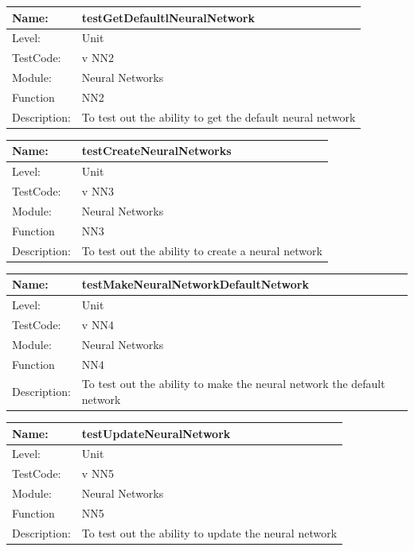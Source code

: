 \documentclass[12pt]{article}
\begin{document}
\begin{flushleft}
\begin{center}
\begin{tabular}{|l|p{12cm}|}
\hline

 Name: & testGetDefaultlNeuralNetwork \\
 \hline
Level: & Unit \\
\hline
TestCode: & v NN2 \\
\hline
Module:& Neural Networks \\
\hline
Function & NN2 \\
\hline
Description: & To test out the ability to get the default neural network  \\
\hline
\end{tabular}
\end{center}
\begin{center}
\begin{tabular}{|l|p{12cm}|}
\hline

 Name: & testCreateNeuralNetworks \\
 \hline
Level: & Unit \\
\hline
TestCode: & v NN3 \\
\hline
Module:& Neural Networks \\
\hline
Function & NN3 \\
\hline
Description: & To test out the ability to create a neural network  \\
\hline
\end{tabular}
\end{center}

\begin{center}
\begin{tabular}{|l|p{12cm}|}
\hline

 Name: & testMakeNeuralNetworkDefaultNetwork \\
 \hline
Level: & Unit \\
\hline
TestCode: & v NN4 \\
\hline
Module:& Neural Networks \\
\hline
Function & NN4 \\
\hline
Description: & To test out the ability to make the neural network the default network  \\
\hline
\end{tabular}
\end{center}

\begin{center}
\begin{tabular}{|l|p{12cm}|}
\hline

 Name: & testUpdateNeuralNetwork \\
 \hline
Level: & Unit \\
\hline
TestCode: & v NN5 \\
\hline
Module:& Neural Networks \\
\hline
Function & NN5 \\
\hline
Description: & To test out the ability to update the neural network  \\
\hline
\end{tabular}
\end{center}


\end{flushleft}
\end{document}
